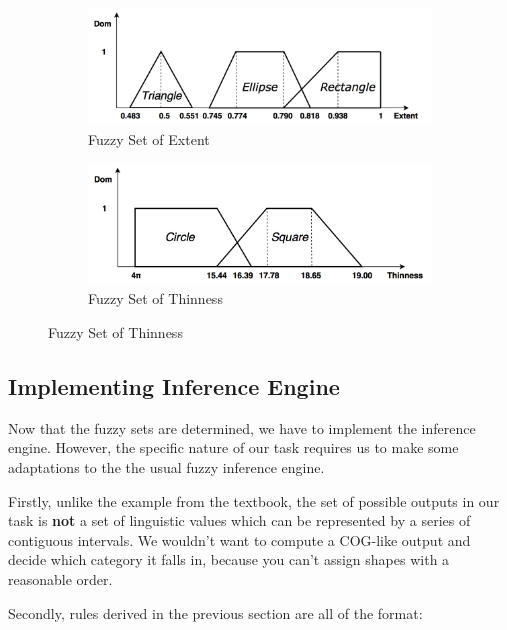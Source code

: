 \begin{figure}

\begin{subfigure}[b]{\columnwidth}
\includegraphics[width=\columnwidth]{Figure_3_Fuzzy_Sets_1.png}
\caption{Fuzzy Set of Extent}\end{subfigure}

\begin{subfigure}[b]{\columnwidth}
\includegraphics[width=\columnwidth]{Figure_4_Fuzzy_Sets_2.png}
\caption{Fuzzy Set of Thinness}
\end{subfigure}

\end{figure}

\subsection{Implementing Inference Engine}

Now that the fuzzy sets are determined, we have to implement the inference engine. However, the specific nature of our task requires us to make some adaptations to the the usual fuzzy inference engine.

Firstly, unlike the example from the textbook, the set of possible outputs in our task is \textbf{not} a set of linguistic values which can be represented by a series of contiguous intervals. We wouldn't want to compute a COG-like output and decide which category it falls in, because you can't assign shapes with a reasonable order.

Secondly, rules derived in the previous section are all of the format:

